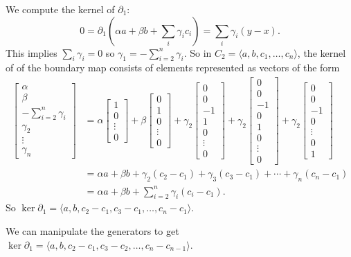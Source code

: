 \documentclass[12pt]{article}
\theoremstyle{definition}
\newcommand{\<}{\langle}
\renewcommand{\>}{\rangle}
\newcommand{\mat}[1]{\begin{bmatrix}#1\end{bmatrix}}
\newcommand{\bd}{\partial}
\begin{document}
We compute the kernel of $\bd_1$:
\[\textstyle
    0
        = \bd_1(\alpha a + \beta b + \sum_i \gamma_i c_i)
        = \sum_i \gamma_i(y - x).
\]
This implies $\sum_i \gamma_i = 0$ so $\gamma_1 = -\sum_{i=2}^{n} \gamma_i$.
So in $C_2 = \<a, b, c_1, \dots, c_n\>$, the kernel of of the boundary map consists of elements represented as vectors of the form
\begin{align*}
    \mat{\alpha \\ \beta \\ -\sum_{i=2}^{n} \gamma_i \\ \gamma_2 \\ \vdots \\ \gamma_n}
        &= \alpha\mat{1 \\ 0 \\ \vdots \\ 0}
            + \beta\mat{0 \\ 1 \\ 0 \\ \vdots \\ 0}
            + \gamma_2\mat{0 \\ 0 \\ -1 \\ 1 \\ 0 \\ \vdots \\ 0}
            + \gamma_2\mat{0 \\ 0 \\ -1 \\ 0 \\ 1 \\ 0 \\ \vdots \\ 0}
            + \gamma_2\mat{0 \\ 0 \\ -1 \\ 0 \\ \vdots \\ 0 \\ 1} \\
        &= \alpha a + \beta b + \gamma_2(c_2 - c_1) + \gamma_3(c_3 - c_1) + \cdots + \gamma_n(c_n - c_1) \\
        &= \alpha a  + \beta b + \sum_{i=2}^{n} \gamma_i(c_i - c_1).
\end{align*}
So $\ker\bd_1 = \<a, b, c_2 - c_1, c_3 - c_1, \dots, c_n - c_1\>$.

We can manipulate the generators to get $\ker\bd_1 = \<a, b, c_2 - c_1, c_3 - c_2, \dots, c_n - c_{n-1}\>$.
\end{document}
